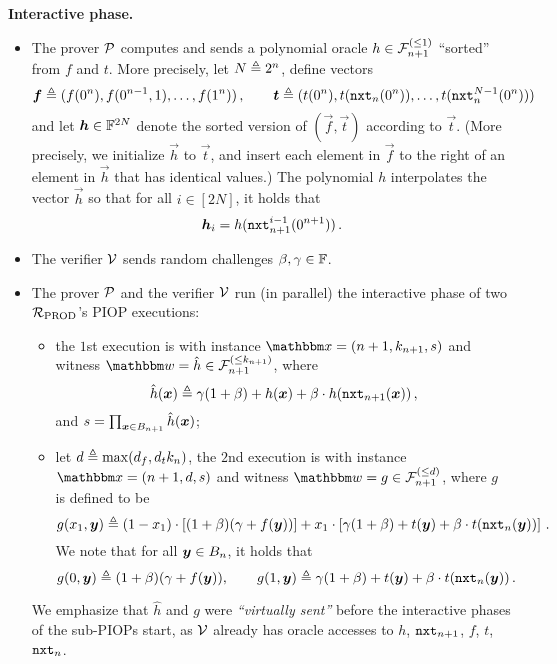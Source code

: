 \textbf{Interactive phase.} 
\begin{itemize}
    \item The prover $\mathcal{P}$ computes and sends a polynomial oracle $h \in {\mathcal{F}}_{n+1}^{(\le{1})}$ ``sorted'' from $f$ and $t$.
        More precisely, let $N \mathrel{\triangleq} 2^n$, define vectors
        \[
            \boldsymbol{f} \mathrel{\triangleq} (f(0^n), f(0^{n-1}, 1), \dots, f(1^n) )\,, \qquad 
            \boldsymbol{t} \mathrel{\triangleq} (t(0^n), t(\mathtt{nxt}_{n}(0^n)), \dots, t(\mathtt{nxt}_{n}^{N-1}(0^n))) 
        \]
        and let $\boldsymbol{h} \in \mathbb{F}^{2N}$ denote the sorted version of $(\vec{f}, \vec{t})$ according to $\vec{t}$.
        (More precisely, we initialize $\vec{h}$ to $\vec{t}$, and 
        insert each element in $\vec{f}$ to the right of an element in $\vec{h}$ that has identical values.)
        The polynomial $h$ interpolates the vector $\vec{h}$ so that for all $i \in [2N]$,
        it holds that
        \[
            \boldsymbol{h}_i = h(\mathtt{nxt}_{n+1}^{i-1}(0^{n+1})) \,.
        \]
        
    \item The verifier $\mathcal{V}$ sends random challenges $\beta, \gamma \in \mathbb{F}$.
    
    \item The prover $\mathcal{P}$ and the verifier $\mathcal{V}$ run (in parallel) the interactive phase 
    of two ${\mathcal{R}}_{\text{PROD}}$'s PIOP executions:
        \begin{itemize}
            \item the $1$st execution is with instance $\instR = (n+1, \sps{n+1}, s)$ and
                witness $\witR = \hat{h} \in \bdp{n+1}{\sps{n+1}}$, where 
                \[
                    \hat{h}(\boldsymbol{x}) \mathrel{\triangleq} \gamma(1+\beta) + h(\boldsymbol{x}) + \beta \cdot h(\mathtt{nxt}_{n+1}(\boldsymbol{x})) \,,
                \] and $s = \prod_{\boldsymbol{x}\in B_{n+1}} \hat{h}(\boldsymbol{x})$;
                
            \item let $d \mathrel{\triangleq} \max(d_f, d_t k_{n})$, the $2$nd execution is with instance 
                $\instR = (n+1, d, s)$ and 
                witness $\witR = g \in \bdp{n+1}{d}$, where $g$ is defined to be 
                \[
                    g(x_1, \boldsymbol{y}) \mathrel{\triangleq} (1-x_1) \cdot \left[(1+\beta)(\gamma + f(\boldsymbol{y}))\right]
                                    + x_1 \cdot \left[\gamma(1+\beta) + t(\boldsymbol{y}) + \beta \cdot t(\mathtt{nxt}_{n}(\boldsymbol{y}))\right]\,.
                \]
                We note that for all $\boldsymbol{y} \in B_{n}$, it holds that
                \[
                    g(0, \boldsymbol{y}) \mathrel{\triangleq} (1+\beta)(\gamma + f(\boldsymbol{y})), \qquad 
                    g(1, \boldsymbol{y}) \mathrel{\triangleq} \gamma(1+\beta) + t(\boldsymbol{y}) + \beta \cdot t(\mathtt{nxt}_{n}(\boldsymbol{y})) \,.
                \]
        \end{itemize}
        We emphasize that $\hat{h}$ and $g$ were \emph{``virtually sent''} before the interactive phases of the sub-PIOPs start,
        as $\mathcal{V}$ already has oracle accesses to $h$, $\mathtt{nxt}_{n+1}$, $f$, $t$, $\mathtt{nxt}_{n}$.
\end{itemize}

